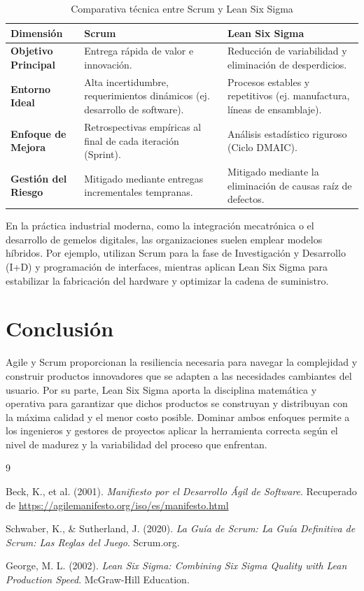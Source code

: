 \documentclass[12pt, a4paper]{article}
\begin{document}
\begin{table}[h]
\centering
\caption{Comparativa técnica entre Scrum y Lean Six Sigma}
\label{tab:comparativa}
\begin{tabularx}{\textwidth}{@{} l X X @{}}
\toprule
\textbf{Dimensión} & \textbf{Scrum} & \textbf{Lean Six Sigma} \\ 
\midrule
\textbf{Objetivo Principal} & Entrega rápida de valor e innovación. & Reducción de variabilidad y eliminación de desperdicios. \\ 
\addlinespace
\textbf{Entorno Ideal} & Alta incertidumbre, requerimientos dinámicos (ej. desarrollo de software). & Procesos estables y repetitivos (ej. manufactura, líneas de ensamblaje). \\ 
\addlinespace
\textbf{Enfoque de Mejora} & Retrospectivas empíricas al final de cada iteración (Sprint). & Análisis estadístico riguroso (Ciclo DMAIC). \\ 
\addlinespace
\textbf{Gestión del Riesgo} & Mitigado mediante entregas incrementales tempranas. & Mitigado mediante la eliminación de causas raíz de defectos. \\ 
\bottomrule
\end{tabularx}
\end{table}

En la práctica industrial moderna, como la integración mecatrónica o el desarrollo de gemelos digitales, las organizaciones suelen emplear modelos híbridos. Por ejemplo, utilizan Scrum para la fase de Investigación y Desarrollo (I+D) y programación de interfaces, mientras aplican Lean Six Sigma para estabilizar la fabricación del hardware y optimizar la cadena de suministro.

\section{Conclusión}
Agile y Scrum proporcionan la resiliencia necesaria para navegar la complejidad y construir productos innovadores que se adapten a las necesidades cambiantes del usuario. Por su parte, Lean Six Sigma aporta la disciplina matemática y operativa para garantizar que dichos productos se construyan y distribuyan con la máxima calidad y el menor costo posible. Dominar ambos enfoques permite a los ingenieros y gestores de proyectos aplicar la herramienta correcta según el nivel de madurez y la variabilidad del proceso que enfrentan.

\newpage
\begin{thebibliography}{9}

Beck, K., et al. (2001). \textit{Manifiesto por el Desarrollo Ágil de Software}. Recuperado de \url{https://agilemanifesto.org/iso/es/manifesto.html}

Schwaber, K., \& Sutherland, J. (2020). \textit{La Guía de Scrum: La Guía Definitiva de Scrum: Las Reglas del Juego}. Scrum.org.

George, M. L. (2002). \textit{Lean Six Sigma: Combining Six Sigma Quality with Lean Production Speed}. McGraw-Hill Education.

\end{thebibliography}
\end{document}
